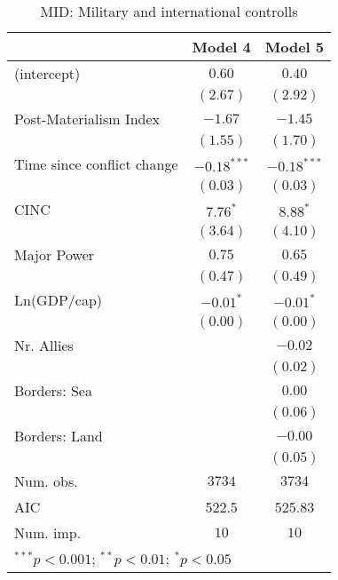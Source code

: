 
\begin{table}
\begin{center}
\begin{tabular}{l c c}
\toprule
 & Model 4 & Model 5 \\
\midrule
(intercept)                & $0.60$        & $0.40$        \\
                           & $(2.67)$      & $(2.92)$      \\
Post-Materialism Index     & $-1.67$       & $-1.45$       \\
                           & $(1.55)$      & $(1.70)$      \\
Time since conflict change & $-0.18^{***}$ & $-0.18^{***}$ \\
                           & $(0.03)$      & $(0.03)$      \\
CINC                       & $7.76^{*}$    & $8.88^{*}$    \\
                           & $(3.64)$      & $(4.10)$      \\
Major Power                & $0.75$        & $0.65$        \\
                           & $(0.47)$      & $(0.49)$      \\
Ln(GDP/cap)                & $-0.01^{*}$   & $-0.01^{*}$   \\
                           & $(0.00)$      & $(0.00)$      \\
Nr. Allies                 &               & $-0.02$       \\
                           &               & $(0.02)$      \\
Borders: Sea               &               & $0.00$        \\
                           &               & $(0.06)$      \\
Borders: Land              &               & $-0.00$       \\
                           &               & $(0.05)$      \\
\midrule
Num. obs.                  & $3734$        & $3734$        \\
AIC                        & 522.5         & 525.83        \\
Num. imp.                  & $10$          & $10$          \\
\bottomrule
\multicolumn{3}{l}{\scriptsize{$^{***}p<0.001$; $^{**}p<0.01$; $^{*}p<0.05$}}
\end{tabular}
\caption{MID: Military and international controlls}
\label{MID_2_PM}
\end{center}
\end{table}
